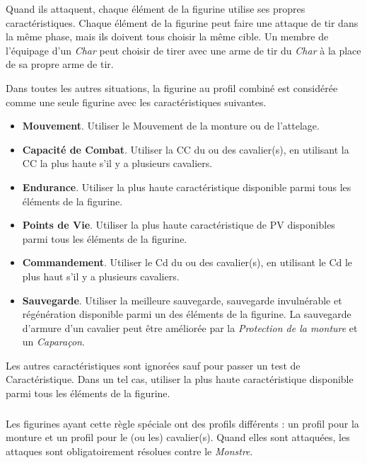 Quand ils attaquent, chaque élément de la figurine utilise ses propres caractéristiques. Chaque élément de la figurine peut faire une attaque de tir dans la même phase, mais ils doivent tous choisir la même cible. Un membre de l'équipage d'un \emph{Char} peut choisir de tirer avec une arme de tir du \emph{Char} à la place de sa propre arme de tir.

Dans toutes les autres situations, la figurine au profil combiné est considérée comme une seule figurine avec les caractéristiques suivantes.

\begin{itemize}[label={-}]
\item \textbf{Mouvement}. Utiliser le Mouvement de la monture ou de l'attelage.
\item \textbf{Capacité de Combat}. Utiliser la CC du ou des cavalier(s), en utilisant la CC la plus haute s'il y a plusieurs cavaliers.
\item \textbf{Endurance}. Utiliser la plus haute caractéristique  disponible parmi tous les éléments de la figurine.
\item \textbf{Points de Vie}. Utiliser la plus haute caractéristique de PV disponibles parmi tous les éléments de la figurine.
\item \textbf{Commandement}. Utiliser le Cd du ou des cavalier(s), en utilisant le Cd le plus haut s'il y a plusieurs cavaliers.
\item \textbf{Sauvegarde}. Utiliser la meilleure sauvegarde, sauvegarde invulnérable et régénération disponible parmi un des éléments de la figurine. La sauvegarde d'armure d'un cavalier peut être améliorée par la \emph{Protection de la monture} et un \emph{Caparaçon}.
\end{itemize}

Les autres caractéristiques sont ignorées sauf pour passer un test de Caractéristique. Dans un tel cas, utiliser la plus haute caractéristique disponible parmi tous les éléments de la figurine.

\subsubsection*{}
\label{profil_monstre_monte}

Les figurines ayant cette règle spéciale ont des profils différents : un profil pour la monture et un profil pour le (ou les) cavalier(s). Quand elles sont attaquées, les attaques sont obligatoirement résolues contre le \emph{Monstre}.

